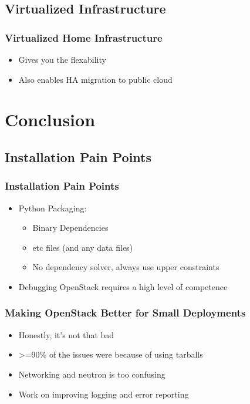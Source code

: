\documentclass[aspectratio=169,11pt,hyperref={colorlinks=true}]{beamer}
\begin{document}
\subsection{Virtualized Infrastructure}
\begin{frame}
    \frametitle{Virtualized Home Infrastructure}
    \begin{itemize}
        \item Gives you the flexability
        \item Also enables HA migration to public cloud
    \end{itemize}
\end{frame}


\section{Conclusion}
\subsection{Installation Pain Points}
\begin{frame}
    \frametitle{Installation Pain Points}
    \begin{itemize}
        \item Python Packaging:
            \begin{itemize}
                \item Binary Dependencies
                \item etc files (and any data files)
                \item No dependency solver, always use upper constraints
            \end{itemize}
        \item Debugging OpenStack requires a high level of competence
    \end{itemize}
\end{frame}
\begin{frame}
    \frametitle{Making OpenStack Better for Small Deployments}
    \begin{itemize}
        \item Honestly, it's not that bad
        \item >=90\% of the issues were because of using tarballs
        \item Networking and neutron is too confusing
        \item Work on improving logging and error reporting
    \end{itemize}
\end{frame}
\end{document}

